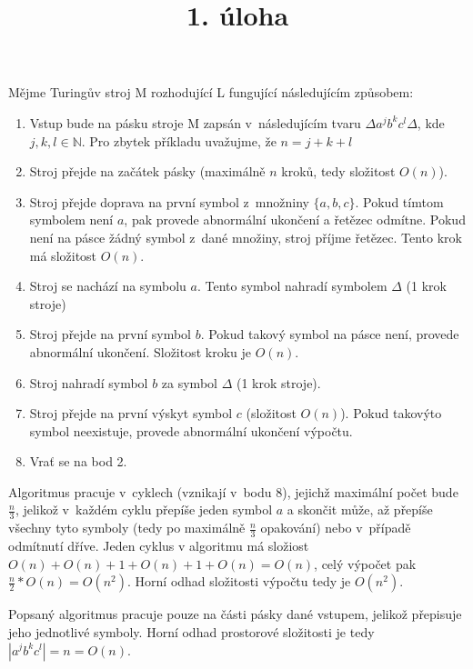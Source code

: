 \documentclass[a4paper]{article}
\title {1. úloha}
\begin{document}
\section*{}
Mějme Turingův stroj M rozhodující L fungující následujícím způsobem:
\begin{enumerate}
    \item Vstup bude na pásku stroje M zapsán v~následujícím tvaru $\Delta a^j b^k c^l\Delta$, kde $j,k,l \in \mathbb{N}$.
    Pro zbytek příkladu uvažujme, že $n=j+k+l$
    \item Stroj přejde na začátek pásky (maximálně $n$ kroků, tedy složitost $O(n)$).
    \item Stroj přejde doprava na první symbol z~množniny $\{a,b,c\}$.
    Pokud tímtom symbolem není $a$, pak provede abnormální ukončení a řetězec odmítne.
    Pokud není na pásce žádný symbol z~dané množiny, stroj příjme řetězec.
    Tento krok má složitost $O(n)$.
    \item Stroj se nachází na symbolu $a$. Tento symbol nahradí symbolem $\Delta$ (1 krok stroje)
    \item Stroj přejde na první symbol $b$.
    Pokud takový symbol na pásce není, provede abnormální ukončení.
    Složitost kroku je $O(n)$.
    \item Stroj nahradí symbol $b$ za symbol $\Delta$ (1 krok stroje).
    \item Stroj přejde na první výskyt symbol $c$ (složitost $O(n)$).
    Pokud takovýto symbol neexistuje, provede abnormální ukončení výpočtu.
    \item Vrať se na bod 2.
\end{enumerate}
Algoritmus pracuje v~cyklech (vznikají v~bodu 8),
jejichž maximální počet bude $\frac{n}{3}$, jelikož v~každém cyklu přepíše jeden symbol $a$ a skončit může, až přepíše
všechny tyto symboly (tedy po maximálně $\frac{n}{3}$ opakování) nebo v~případě odmítnutí dříve.
Jeden cyklus v algoritmu má složiost $O(n)+O(n)+1+O(n)+1+O(n)=O(n)$, celý výpočet pak
$\frac{n}{2}*O(n)=O(n^2)$. Horní odhad složitosti výpočtu tedy je $O(n^2)$.

Popsaný algoritmus pracuje pouze na části pásky dané vstupem, jelikož přepisuje jeho jednotlivé symboly.
Horní odhad prostorové složitosti je tedy $|a^j b^k c^l|=n=O(n)$. 
\end{document}

